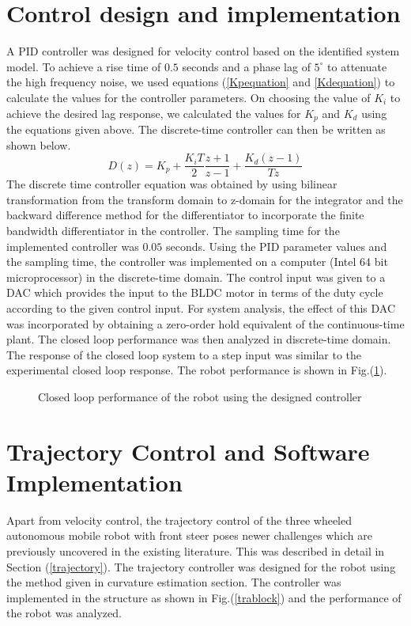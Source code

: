 \documentclass[conference]{IEEEtran}
\begin{document}
\section{Control design and implementation}
\label{controlimp}
A PID controller was designed for velocity control based on the identified system model. To achieve a rise time of $0.5$ seconds and a phase lag of $5^{\circ}$ to attenuate the high frequency noise, we used equations (\ref{Kpequation} and \ref{Kdequation}) to calculate the values for the controller parameters. On choosing the value of $K_{i}$ to achieve the desired lag response, we calculated the values for $K_{p}$  and $K_{d}$ using the equations given above. The discrete-time controller can then be written as shown below.
\begin{equation}
D(z) = K_{p} + \frac{K_{i} T }{2}\frac{z+1}{z-1} + \frac{K_{d} (z-1)}{Tz}
\end{equation}
The discrete time controller equation was obtained by using bilinear transformation from the transform domain to z-domain for the integrator and the backward difference method for the differentiator to incorporate the finite bandwidth differentiator in the controller. The sampling time for the implemented controller was $0.05$ seconds. Using the PID parameter values and the sampling time, the controller was implemented on a computer (Intel 64 bit microprocessor) in the discrete-time domain. The control input was given to a DAC which provides the input to the BLDC motor in terms of the duty cycle according to the given control input. For system analysis, the effect of this DAC was incorporated by obtaining a zero-order hold equivalent of the continuous-time plant. The closed loop performance was then analyzed in discrete-time domain. The response of the closed loop system to a step input was similar to the experimental closed loop response. The robot performance is shown in Fig.(\ref{xyx}).
\begin{figure}[htbp]

			  \centering
%			  
			  \def\svgscale{0.25}
			  \tiny{
			  }
			  \caption{Closed loop performance of the robot using the designed controller}
			 \label{xyx}
		\end{figure}


\section{Trajectory Control and Software Implementation}
Apart from velocity control, the trajectory control of the three wheeled autonomous mobile robot with front steer poses newer challenges which are previously uncovered in the existing literature. This was described in detail in Section (\ref{trajectory}). The trajectory controller was designed for the robot using the method given in curvature estimation section. The controller was implemented in the structure as shown in Fig.(\ref{trablock}) and the performance of the robot was analyzed.\\
\end{document}

